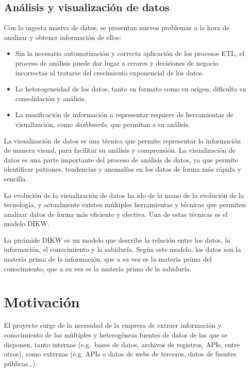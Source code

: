 \newpage{}
\subsection{Análisis y visualización de datos}\label{subsec:datos}
Con la ingesta masiva de datos, se presentan nuevos problemas a la hora de analizar y obtener
información de ellos:

\begin{itemize}
	\item Sin la necesaria automatización y correcta aplicación de los procesos ETL,
		el proceso de análisis puede dar lugar a errores y decisiones de negocio incorrectas
		al tratarse del crecimiento exponencial de los datos.
	\item La heterogeneidad de los datos, tanto en formato como en origen, dificulta su
		consolidación y análisis.
	\item La masificación de información a representar requiere de herramientas de visualización,
		como \textit{dashboards}, que permitan a su análisis.
\end{itemize}

La visualización de datos es una técnica que permite representar la información de manera visual,
para facilitar su análisis y comprensión. La visualización de datos es una parte importante del
proceso de análisis de datos, ya que permite identificar patrones, tendencias y anomalías en los
datos de forma más rápida y sencilla.

La evolución de la visualización de datos ha ido de la mano de la evolución de la tecnología, y
actualmente existen múltiples herramientas y técnicas que permiten analizar datos de forma
más eficiente y efectiva. Una de estas técnicas es el modelo DIKW.

La pirámide DIKW\cite{enwiki:1211227190} es un modelo que describe la relación entre los datos,
la información, el conocimiento y la sabiduría. Según este modelo, los datos son la materia prima
de la información, que a su vez es la materia prima del conocimiento, que a su vez es la materia
prima de la sabiduría.

\newpage{}
\section{Motivación}\label{sec:motivacion}
El proyecto surge de la necesidad de la empresa de extraer información y conocimiento de las
múltiples y heterogéneas fuentes de datos de las que se disponen, tanto internas (e.g.~bases de
datos, archivos de registros, APIs, entre otros), como externas (e.g. APIs o datos de webs de
terceros, datos de fuentes públicas\ldots).

